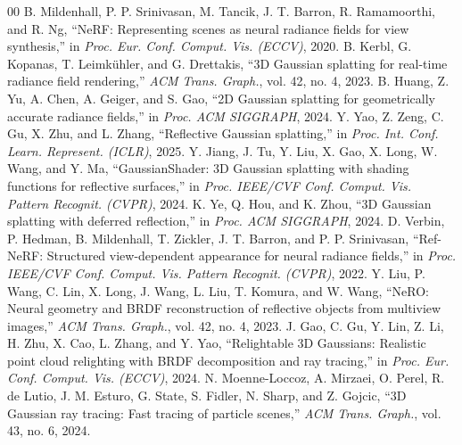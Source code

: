\documentclass[conference]{IEEEtran}
\begin{document}
\begin{thebibliography}{00}
 B. Mildenhall, P. P. Srinivasan, M. Tancik, J. T. Barron, R. Ramamoorthi, and R. Ng, ``NeRF: Representing scenes as neural radiance fields for view synthesis,'' in \textit{Proc. Eur. Conf. Comput. Vis. (ECCV)}, 2020.
 B. Kerbl, G. Kopanas, T. Leimkühler, and G. Drettakis, ``3D Gaussian splatting for real-time radiance field rendering,'' \textit{ACM Trans. Graph.}, vol. 42, no. 4, 2023.
 B. Huang, Z. Yu, A. Chen, A. Geiger, and S. Gao, ``2D Gaussian splatting for geometrically accurate radiance fields,'' in \textit{Proc. ACM SIGGRAPH}, 2024.
 Y. Yao, Z. Zeng, C. Gu, X. Zhu, and L. Zhang, ``Reflective Gaussian splatting,'' in \textit{Proc. Int. Conf. Learn. Represent. (ICLR)}, 2025.
 Y. Jiang, J. Tu, Y. Liu, X. Gao, X. Long, W. Wang, and Y. Ma, ``GaussianShader: 3D Gaussian splatting with shading functions for reflective surfaces,'' in \textit{Proc. IEEE/CVF Conf. Comput. Vis. Pattern Recognit. (CVPR)}, 2024.
 K. Ye, Q. Hou, and K. Zhou, ``3D Gaussian splatting with deferred reflection,'' in \textit{Proc. ACM SIGGRAPH}, 2024.
 D. Verbin, P. Hedman, B. Mildenhall, T. Zickler, J. T. Barron, and P. P. Srinivasan, ``Ref-NeRF: Structured view-dependent appearance for neural radiance fields,'' in \textit{Proc. IEEE/CVF Conf. Comput. Vis. Pattern Recognit. (CVPR)}, 2022.
 Y. Liu, P. Wang, C. Lin, X. Long, J. Wang, L. Liu, T. Komura, and W. Wang, ``NeRO: Neural geometry and BRDF reconstruction of reflective objects from multiview images,'' \textit{ACM Trans. Graph.}, vol. 42, no. 4, 2023.
 J. Gao, C. Gu, Y. Lin, Z. Li, H. Zhu, X. Cao, L. Zhang, and Y. Yao, ``Relightable 3D Gaussians: Realistic point cloud relighting with BRDF decomposition and ray tracing,'' in \textit{Proc. Eur. Conf. Comput. Vis. (ECCV)}, 2024.
 N. Moenne-Loccoz, A. Mirzaei, O. Perel, R. de Lutio, J. M. Esturo, G. State, S. Fidler, N. Sharp, and Z. Gojcic, ``3D Gaussian ray tracing: Fast tracing of particle scenes,'' \textit{ACM Trans. Graph.}, vol. 43, no. 6, 2024.
\end{thebibliography}
\end{document}
